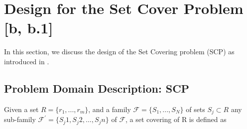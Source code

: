 \documentclass[12pt]{article}
\begin{document}
\section{Design for the Set Cover Problem [b, b.1]} \label{scn:design}

In this section, we discuss the design of the Set Covering problem (SCP) as introduced in \cite{ClassNotes686}.

\subsection{Problem Domain Description: SCP}
Given a set $R=\{r_1,...,r_m\}$, and a family $\mathcal{F}=\{S_1,...,S_N\}$ of sets $S_j \subset R$ any sub-family $\mathcal{F^\prime}=\{S_j1, S_j2,...,S_jn\}$ of $\mathcal{F}$, a set covering of R is defined as


\pagebreak




\end{document}
